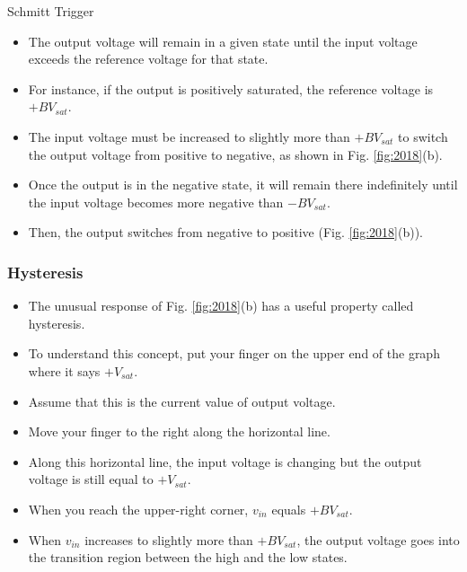 \documentclass[pdflatex,compress]{beamer}
\begin{document}
\begin{frame}{Schmitt Trigger}
	\begin{itemize}
		\item The output voltage will remain in a given state until the input voltage exceeds the reference voltage for that state.
		\item For instance, if the output is positively saturated, the reference voltage is $+BV_{sat}$.
		\item The input voltage must be increased to slightly more than $+BV_{sat}$ to switch the output voltage from positive to negative, as shown in Fig. \ref{fig:2018}(b).
		\item Once the output is in the negative state, it will remain there indefinitely until the input voltage becomes more negative than $-BV_{sat}$.
		\item Then, the output switches from negative to positive (Fig. \ref{fig:2018}(b)).
	\end{itemize}
\end{frame}

\begin{frame}
	\frametitle{Hysteresis}
	\begin{itemize}
		\item The unusual response of Fig. \ref{fig:2018}(b) has a useful property called hysteresis.
		\item To understand this concept, put your finger on the upper end of the graph where it says $+V_{sat}$.
		\item Assume that this is the current value of output voltage.
		\item Move your finger to the right along the horizontal line.
		\item Along this horizontal line, the input voltage is changing but the output voltage is still equal to $+V_{sat}$.
		\item When you reach the upper-right corner, $v_{in}$ equals $+BV_{sat}$.
		\item When $v_{in}$ increases to slightly more than $+BV_{sat}$, the output voltage goes into the transition region between the high and the low states.
	\end{itemize}
\end{frame}
\end{document}
